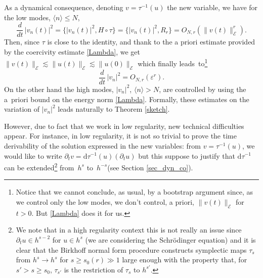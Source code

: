 \documentclass[JEP,XML,SOM,Unicode,NoEqCountersInSection,published]{cedram}
\theoremstyle{definition}
\begin{document}
As a dynamical consequence, denoting $v=\tau^{-1}(u)$ the new variable, we have for the low modes, $\langle n \rangle \leq N$,
\[
\frac{d}{dt}\,|v_n(t)|^2=\{|v_n(t)|^2,H\circ \tau\}=\{|v_n(t)|^2,R_r\}= O_{N,r}(\|v(t)\|_{\mathcal{E}}^r).
\]
Then, since $\tau$ is close to the identity, and
thank to the a priori estimate provided by the coercivity estimate \eqref{Lambda}, we get
$\|v(t)\|_{\mathcal{E}}\lesssim\|u(t)\|_{\mathcal{E}}\lesssim \|u(0)\|_{\mathcal{E}}$ which finally leads~to\footnote{Notice that we cannot conclude, as usual, by a bootstrap argument since, as we control only the low modes, we don't control, a priori, $\|v(t)\|_{\mathcal{E}}$ for $t>0$. But \eqref{Lambda} does it for us.}
\[
\frac{d}{dt}\,|v_n|^2=O_{N,r}(\varepsilon^r).
\]
On the other hand the high modes, $|v_n|^2$, $\langle n\rangle > N$, are controlled by using the a~priori bound on the energy norm \eqref{Lambda}. Formally, these estimates on the variation of $|v_n|^2$ leads naturally to Theorem \ref{sketch}.

However, due to fact that we work in low regularity, new technical difficulties appear. For instance, in low regularity, it is not so trivial to prove the time derivability of the solution expressed in the new variables: from $v=\tau^{-1}(u)$, we would like to write $\partial_t v= \mathrm{d}\tau^{-1}(u)(\partial_t u)$ but this suppose to justify that $\mathrm{d}\tau^{-1}$ can be extended\footnote{We note that in a high regularity context this is not really an issue since $\partial_t u \in h^{s-2}$ for $u\in h^s$ (we are considering the Schrödinger equation) and it is clear that the Birkhoff normal form procedure constructs symplectic maps $\tau_s$ from $h^s\to h^s$ for $s\geq s_0(r)\gg 1$ large enough with the property that, for $s'>s\geq s_0$, $\tau_{s'}$ is the restriction of $\tau_s$ to $h^{s'}$.} from~$h^s$ to~$h^{-s}$(see Section \ref{sec_dyn_co}).
\end{document}

